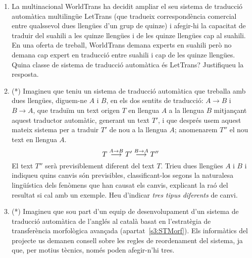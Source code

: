 \begin{enumerate}
\item La multinacional WorldTrans ha decidit ampliar el seu sistema de
  traducció automàtica multilingüe LetTrans (que tradueix
  correspondència comercial entre qualssevol dues llengües d'un grup
  de quinze) i afegir-hi la capacitat de traduir del suahili a les
  quinze llengües i de les quinze llengües cap al suahili. En una
  oferta de treball, WorldTrans demana experts en suahili però no
  demana cap expert en traducció entre suahili i cap de les quinze
  llengües. Quina classe de sistema de traducció automàtica és
  LetTrans?  Justifiqueu la resposta.

\item (*) Imagineu que teniu un sistema de traducció automàtica que
  treballa amb dues llengües, diguem-ne $A$ i $B$, en els dos sentits
  de traducció: $A{\rightarrow}B$ i $B{\rightarrow}A$, que traduïm un
  text origen $T$ en llengua $A$ a la llengua $B$ mitjançant aquest
  traductor automàtic, generant un text $T'$, i que després usem
  aquest mateix sistema per a traduir $T'$ de nou a la llengua $A$;
  anomenarem $T''$ el nou text en llengua $A$.
  \begin{equation}
    T \stackrel{\scriptsize A\rightarrow
      B}{\longrightarrow}T'\stackrel{\scriptsize B\rightarrow
      A}{\longrightarrow} T''
  \end{equation}
  El text $T''$ serà previsiblement diferent del text $T$.  Trieu dues
  llengües $A$ i $B$ i indiqueu quins canvis són previsibles,
  classificant-los segons la naturalesa lingüística dels fenòmens que
  han causat els canvis, explicant la raó del resultat si cal amb un
  exemple. Heu d'indicar \emph{tres tipus diferents} de canvi.

\item (*) Imagineu que sou part d'un equip de desenvolupament d'un
  sistema de traducció automàtica de l'anglés al català basat en
  l'estratègia de transferència morfològica avançada
  (apartat~\ref{s3:STMorf}). Els informàtics del projecte us demanen
  consell sobre les regles de reordenament del sistema, ja que, per
  motius tècnics, només poden afegir-n'hi tres.
      

\end{enumerate}
